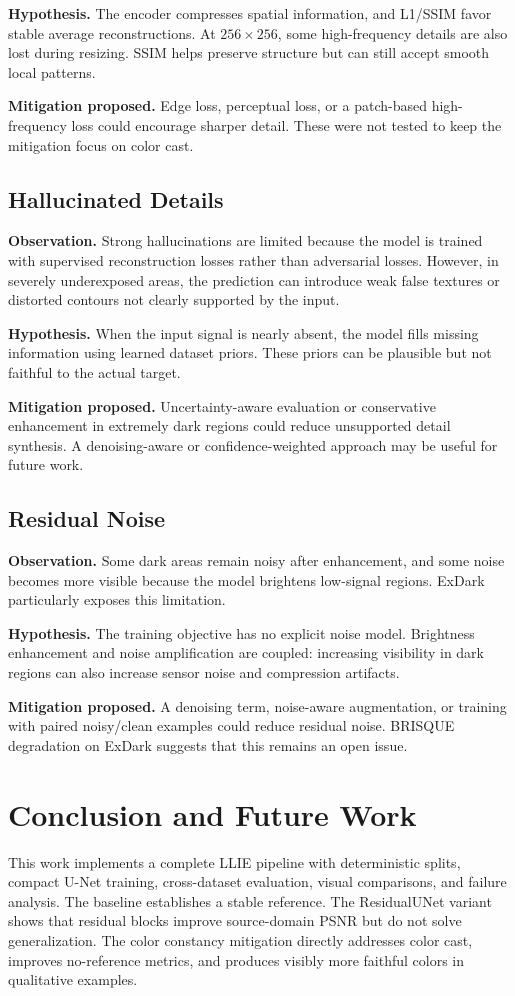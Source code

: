\documentclass[10pt,twocolumn]{article}
\begin{document}
\textbf{Hypothesis.} The encoder compresses spatial information, and L1/SSIM favor stable average reconstructions. At $256 \times 256$, some high-frequency details are also lost during resizing. SSIM helps preserve structure but can still accept smooth local patterns.

\textbf{Mitigation proposed.} Edge loss, perceptual loss, or a patch-based high-frequency loss could encourage sharper detail. These were not tested to keep the mitigation focus on color cast.

\subsection{Hallucinated Details}
\textbf{Observation.} Strong hallucinations are limited because the model is trained with supervised reconstruction losses rather than adversarial losses. However, in severely underexposed areas, the prediction can introduce weak false textures or distorted contours not clearly supported by the input.

\textbf{Hypothesis.} When the input signal is nearly absent, the model fills missing information using learned dataset priors. These priors can be plausible but not faithful to the actual target.

\textbf{Mitigation proposed.} Uncertainty-aware evaluation or conservative enhancement in extremely dark regions could reduce unsupported detail synthesis. A denoising-aware or confidence-weighted approach may be useful for future work.

\subsection{Residual Noise}
\textbf{Observation.} Some dark areas remain noisy after enhancement, and some noise becomes more visible because the model brightens low-signal regions. ExDark particularly exposes this limitation.

\textbf{Hypothesis.} The training objective has no explicit noise model. Brightness enhancement and noise amplification are coupled: increasing visibility in dark regions can also increase sensor noise and compression artifacts.

\textbf{Mitigation proposed.} A denoising term, noise-aware augmentation, or training with paired noisy/clean examples could reduce residual noise. BRISQUE degradation on ExDark suggests that this remains an open issue.



\section{Conclusion and Future Work}
This work implements a complete LLIE pipeline with deterministic splits, compact U-Net training, cross-dataset evaluation, visual comparisons, and failure analysis. The baseline establishes a stable reference. The ResidualUNet variant shows that residual blocks improve source-domain PSNR but do not solve generalization. The color constancy mitigation directly addresses color cast, improves no-reference metrics, and produces visibly more faithful colors in qualitative examples.
\end{document}
